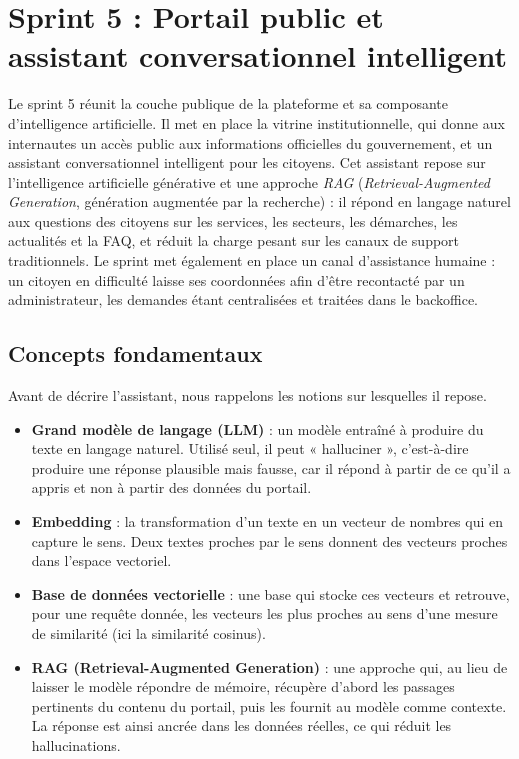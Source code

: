 \section{Sprint 5 : Portail public et assistant conversationnel intelligent}
Le sprint 5 réunit la couche publique de la plateforme et sa composante d'intelligence artificielle. Il met en place la vitrine institutionnelle, qui donne aux internautes un accès public aux informations officielles du gouvernement, et un assistant conversationnel intelligent pour les citoyens. Cet assistant repose sur l'intelligence artificielle générative et une approche \textit{RAG} (\textit{Retrieval-Augmented Generation}, génération augmentée par la recherche) : il répond en langage naturel aux questions des citoyens sur les services, les secteurs, les démarches, les actualités et la FAQ, et réduit la charge pesant sur les canaux de support traditionnels. Le sprint met également en place un canal d'assistance humaine : un citoyen en difficulté laisse ses coordonnées afin d'être recontacté par un administrateur, les demandes étant centralisées et traitées dans le backoffice.


\subsection{Concepts fondamentaux}
Avant de décrire l'assistant, nous rappelons les notions sur lesquelles il repose.

\begin{itemize}
    \item \textbf{Grand modèle de langage (LLM)} : un modèle entraîné à produire du texte en langage naturel. Utilisé seul, il peut « halluciner », c'est-à-dire produire une réponse plausible mais fausse, car il répond à partir de ce qu'il a appris et non à partir des données du portail.
    \item \textbf{Embedding} : la transformation d'un texte en un vecteur de nombres qui en capture le sens. Deux textes proches par le sens donnent des vecteurs proches dans l'espace vectoriel.
    \item \textbf{Base de données vectorielle} : une base qui stocke ces vecteurs et retrouve, pour une requête donnée, les vecteurs les plus proches au sens d'une mesure de similarité (ici la similarité cosinus).
    \item \textbf{RAG (Retrieval-Augmented Generation)} : une approche qui, au lieu de laisser le modèle répondre de mémoire, récupère d'abord les passages pertinents du contenu du portail, puis les fournit au modèle comme contexte. La réponse est ainsi ancrée dans les données réelles, ce qui réduit les hallucinations.
\end{itemize}

